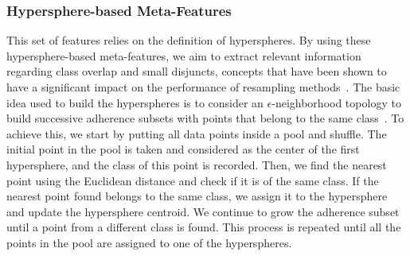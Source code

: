 \documentclass{article}
\begin{document}
\subsubsection{Hypersphere-based Meta-Features}
This set of features relies on the definition of hyperspheres. By using these hypersphere-based meta-features, we aim to extract relevant information regarding class overlap and small disjuncts, concepts that have been shown to have a significant impact on the performance of resampling methods~\cite{brancoSurveyPredictiveModeling2016}. The basic idea used to build the hyperspheres is to consider an $\epsilon$-neighborhood topology to build successive adherence subsets with points that belong to the same class~\cite{waltDataMeasuresThat2008}. To achieve this, we start by putting all data points inside a pool and shuffle. The initial point in the pool is taken and considered as the center of the first hypersphere, and the class of this point is recorded. Then, we find the nearest point using the Euclidean distance and check if it is of the same class. If the nearest point found belongs to the same class, we assign it to the hypersphere and update the hypersphere centroid. We continue to grow the adherence subset until a point from a different class is found. This process is repeated until all the points in the pool are assigned to one of the hyperspheres.
\end{document}

